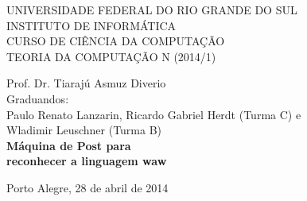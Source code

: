 \documentclass[a4paper]{article}
\begin{document}
\begin{titlepage}
\begin{center}


\large{ 
\uppercase{ Universidade Federal do Rio Grande do Sul\\

Instituto de Informática \\

Curso de Ciência da Computação \\

Teoria da Computação N (2014/1)\\
}

Prof. Dr. Tiarajú Asmuz Diverio \\


Graduandos: \\ Paulo Renato Lanzarin, Ricardo Gabriel Herdt (Turma C) e \\
	Wladimir Leuschner (Turma B) \\[4.5cm]



\LARGE {\bfseries Máquina de Post para \\
	reconhecer a linguagem waw \\[1.0cm]
}}


\vfill

Porto Alegre, 28 de abril de 2014

\end{center}
\end{titlepage}
\end{document}
